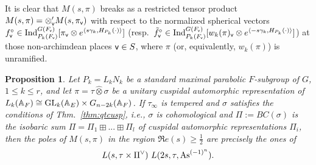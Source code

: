 \documentclass[a4paper,10pt]{amsart}
\newtheorem{prop}[equation]{Proposition}
\theoremstyle{definition}
\numberwithin{equation}{section}
\def\A{\mathbb A}
\def\GL{{\rm GL}}
\def\vv{{\sf v}} %
\begin{document}
It is clear that $M(s,\pi)$ breaks as a restricted tensor product $M(s,\pi)=\otimes'_\vv M(s,\pi_\vv)$ with respect to the normalized spherical vectors $f^\circ_\vv\in {\rm Ind}_{P_k(F_\vv)}^{G(F_\vv)}[\pi_\vv\otimes e^{\langle s\gamma_k,H_{P_k}(\cdot)\rangle}]$ (resp.\ $\tilde f^\circ_\vv\in {\rm Ind}_{P_k(F_\vv)}^{G(F_\vv)}[w_k(\pi)_\vv\otimes e^{\langle -s\gamma_k,H_{P_k}(\cdot)\rangle}]$) at those non-archimdean places $\vv\in S$, where $\pi$ (or, equivalently, $w_k(\pi)$) is unramified. 

\begin{prop}\label{prop:Msp}
Let $P_k=L_kN_k$ be a standard maximal parabolic $F$-subgroup of $G$, $1\leq k\leq r$, and let $\pi=\tau\hat\otimes\sigma$ be a unitary cuspidal automorphic representation of $L_k(\A_F)\cong \GL_k(\A_E)\times G_{n-2k}(\A_F)$. If $\tau_\infty$ is tempered and $\sigma$ satisfies the conditions of Thm.\ \ref{thm:qtcusp}, i.e., $\sigma$ is cohomological and $\Pi:=BC(\sigma)$ is the isobaric sum $\Pi=\Pi_1\boxplus...\boxplus\Pi_l$ of cuspidal automorphic representations $\Pi_i$, then the poles of $M(s,\pi)$ in the region $\Re e(s)\geq \tfrac12$ are precisely the ones of  
$$ L(s,\tau\times \Pi^\vee) \ L(2s, \tau, {\rm As}^{(-1)^n}).$$
\end{prop}
\end{document}
